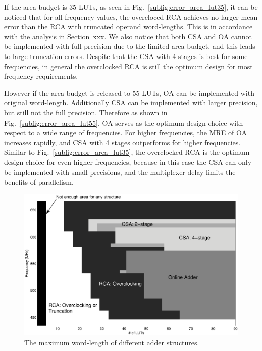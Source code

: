 \documentclass[10pt, conference, compsocconf]{IEEEtran}
\begin{document}
If the area budget is 35 LUTs, as seen in Fig.~\ref{subfig:error_area_lut35}, it can be noticed that for all frequency values, the overcloced RCA achieves no larger mean error than the RCA with truncated operand word-lengths. This is in accordance with the analysis in Section~xxx. We also notice that both CSA and OA cannot be implemented with full precision due to the limited area budget, and this leads to large truncation errors. Despite that the CSA with 4 stages is best for some frequencies, in general the overclocked RCA is still the optimum design for most frequency requirements.  

However if the area budget is released to 55 LUTs, OA can be implemented with original word-length. Additionally CSA can be implemented with larger precision, but still not the full precision. Therefore as shown in Fig.~\ref{subfig:error_area_lut55}, OA serves as the optimum design choice with respect to a wide range of frequencies. For higher frequencies, the MRE of OA increases rapidly, and CSA with 4 stages outperforms for higher frequencies. Similar to Fig.~\ref{subfig:error_area_lut35}, the overclocked RCA is the optimum design choice for even higher frequencies, because in this case the CSA can only be implemented with small precisions, and the multiplexer delay limits the benefits of parallelism.
%
\begin{figure}[tbp]
  \centering
  \includegraphics[width=.8\textwidth]{./figures/exp/3d_FreqArea.eps}
  \caption{The maximum word-length of different adder structures.}
  \label{Fig:adder_3d_FreqArea}
\end{figure}
\end{document}
